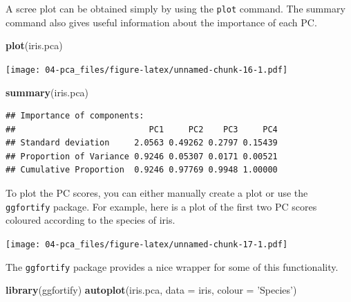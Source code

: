 \documentclass[]{book}
\newenvironment{Shaded}{\begin{snugshade}}{\end{snugshade}}
\newcommand{\DataTypeTok}[1]{\textcolor[rgb]{0.13,0.29,0.53}{#1}}
\newcommand{\DecValTok}[1]{\textcolor[rgb]{0.00,0.00,0.81}{#1}}
\newcommand{\KeywordTok}[1]{\textcolor[rgb]{0.13,0.29,0.53}{\textbf{#1}}}
\newcommand{\NormalTok}[1]{#1}
\newcommand{\OperatorTok}[1]{\textcolor[rgb]{0.81,0.36,0.00}{\textbf{#1}}}
\newcommand{\StringTok}[1]{\textcolor[rgb]{0.31,0.60,0.02}{#1}}
\theoremstyle{definition}
\theoremstyle{definition}
\theoremstyle{definition}
\theoremstyle{remark}
\begin{document}
A scree plot can be obtained simply by using the \texttt{plot} command. The summary command also gives useful information about the importance of each PC.

\begin{Shaded}
\begin{Highlighting}[]
\KeywordTok{plot}\NormalTok{(iris.pca)}
\end{Highlighting}
\end{Shaded}

\texttt{[image: 04-pca\_files/figure-latex/unnamed-chunk-16-1.pdf]}

\begin{Shaded}
\begin{Highlighting}[]
\KeywordTok{summary}\NormalTok{(iris.pca)}
\end{Highlighting}
\end{Shaded}

\begin{verbatim}
## Importance of components:
##                           PC1     PC2    PC3     PC4
## Standard deviation     2.0563 0.49262 0.2797 0.15439
## Proportion of Variance 0.9246 0.05307 0.0171 0.00521
## Cumulative Proportion  0.9246 0.97769 0.9948 1.00000
\end{verbatim}

To plot the PC scores, you can either manually create a plot or use the \texttt{ggfortify} package. For example, here is a plot of the first two PC scores coloured according to the species of iris.

\begin{Shaded}
\end{Shaded}

\texttt{[image: 04-pca\_files/figure-latex/unnamed-chunk-17-1.pdf]}

The \texttt{ggfortify} package provides a nice wrapper for some of this functionality.

\begin{Shaded}
\begin{Highlighting}[]
\KeywordTok{library}\NormalTok{(ggfortify)}
\KeywordTok{autoplot}\NormalTok{(iris.pca, }\DataTypeTok{data =}\NormalTok{ iris, }\DataTypeTok{colour =} \StringTok{'Species'}\NormalTok{)}
\end{Highlighting}
\end{Shaded}
\end{document}
